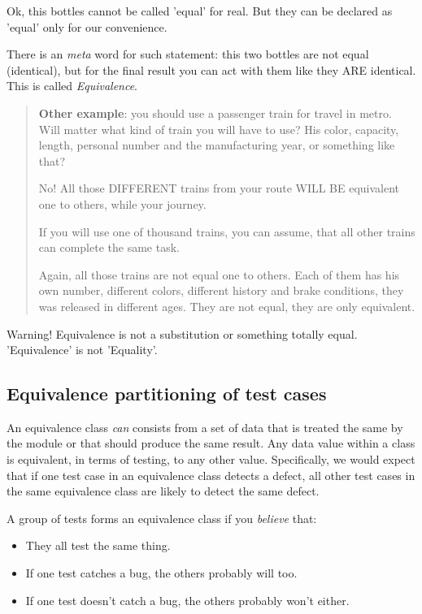 Ok, this bottles cannot be called 'equal' for real. But they can be declared as 'equal' only for our convenience.

There is an \emph{meta} word for such statement: this two bottles are not equal (identical), but for the final result you can act with them like they ARE identical. This is called \emph{Equivalence}.

\begin{quote}
 
\textbf{Other example}: you should use a passenger train for travel in metro. Will matter what kind of train you will have to use? His color, capacity, length, personal number and the manufacturing year, or something like that?

No! All those DIFFERENT trains from your route WILL BE equivalent one to others, while your journey.

If you will use one of thousand trains, you can assume, that all other trains can complete the same task.

Again, all those trains are not equal one to others. Each of them has his own number, different colors, different history and brake conditions, they was released in different ages. They are not equal, they are only equivalent.
\end{quote}

Warning! Equivalence is not a substitution or something totally equal. 'Equivalence' is not 'Equality'.


\subsection{Equivalence partitioning of test cases}

An equivalence class \emph{can} consists from a set of data that is treated the same by the module or that should produce the same result. Any data value within a class is equivalent, in terms of testing, to any other value. Specifically, we would expect that if one test case in an equivalence class detects a defect, all other test cases in the same equivalence class are likely to detect the same defect.

A group of tests forms an equivalence class if you \emph{believe} that:

\begin{itemize}
\item 
They all test the same thing.
\item 
If one test catches a bug, the others probably will too.
\item 
If one test doesn't catch a bug, the others probably won't either.\end{itemize}

